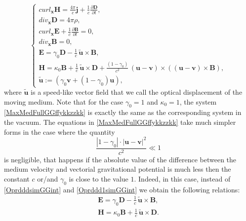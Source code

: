 \documentclass{article}
\theoremstyle{definition}
\theoremstyle{remark}
\renewcommand{\vec}[1]{\mathbf{#1}}
\newcommand{\R}{\mathbb{R}}
\newcommand{\er}{\eqref}
\newcommand{\R}{{\mathbb{R}}}
\newcommand{\er}{\eqref}
\begin{document}
\begin{equation}\label{MaxMedFullGGffykkzzkk}
\begin{cases}
curl_{\vec x} \vec H=\frac{4\pi}{c}\vec j+
\frac{1}{c}\frac{\partial \vec D}{\partial t},\\
div_{\vec x} \vec D=4\pi\rho,\\
curl_{\vec x} \vec E+\frac{1}{c}\frac{\partial \vec B}{\partial t}=0,\\
div_{\vec x} \vec B=0,\\
\vec E=\gamma_0\vec D-\frac{1}{c}\,\vec {\tilde u}\times \vec B,\\
\vec H=\kappa_0\vec B+\frac{1}{c}\,\vec {\tilde u}\times \vec
D+\frac{(1-\gamma_0)}{c^2}\,(\vec u-\vec v)\times\left(\left(\vec
u-\vec v\right)\times \vec B\right),\\
\vec {\tilde u}:=\left(\gamma_0\vec v+(1-\gamma_0)\vec u\right),
\end{cases}
\end{equation}
where $\vec {\tilde u}$ is a speed-like vector field that we call
the optical displacement of the moving medium. Note that for the
case $\gamma_0=1$ and $\kappa_0=1$, the system
\er{MaxMedFullGGffykkzzkk} is exactly the same as the corresponding
system in the vacuum. The equations in \er{MaxMedFullGGffykkzzkk}
take much simpler forms in the case where the quantity
\begin{equation}\label{OprdddsimGGffyhjyhhtygrffgfzzkk}
\frac{|1-\gamma_0|\cdot|\vec u-\vec v|^2}{c^2}\ll 1
\end{equation} is
negligible, that happens if the absolute value of the difference
between the medium velocity and vectorial gravitational potential is
much less then the constant $c$ or/and $\gamma_0$ is close to the
value $1$. Indeed, in this case, instead of \er{OprdddsimGGint} and
\er{Oprddd1simGGint} we obtain the following relations:
\begin{align}\label{OprdddsimsimsimGGint}
\vec E=\gamma_0\vec D-\frac{1}{c}\,\vec {\tilde u}\times \vec B,\\
\label{Oprddd1simsimsimGGint}
\vec H=\kappa_0\vec B+\frac{1}{c}\,\vec {\tilde u}\times \vec D.
\end{align}
\end{document}
